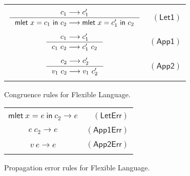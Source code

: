 \documentclass[preprint,authoryear,sort&compress,9pt,nocopyrightspace]{article}
\newcommand\rulename[1]{\mathsf{(#1)}}
\newcommand{\tto}{\longrightarrow}
\newcommand{\oletP}[3]{\mathsf{mlet} \ x = #2 \ \mathsf{in}  \ #3}
\newcommand{\semanticA}{Flexible Language}
\begin{document}
\begin{figure}[h]
\begin{small}
\begin{center}
\begin{tabular}{|c r|}
\hline
&\\
$ \inference {c_1 \tto c_1'}{\oletP{T_1}{c_1}{c_2} \tto \oletP{T_1}{c_1'}{c_2} }$&$\rulename{Let1} $\\
&\\
$\inference {c_1 \tto c_1'}{c_1 \ c_2 \tto c_1' \ c_2} $&$\rulename{App1}  $\\
&\\
$ \inference {c_2 \tto c_2'}{v_1 \ c_2 \tto v_1 \ c_2'}$&$\rulename{App2}  $\\
&\\
\hline
\end{tabular}
\caption{Congruence rules for \semanticA.}
\label{tabla:congruenceRules}
\end{center}
\end{small}
\end{figure}

\begin{figure}[h]
\begin{small}
\begin{center}
\begin{tabular}{|c r|}
\hline
&\\
$ {\oletP{T_1}{e}{c_2} \tto e  }$&$\rulename{LetErr} $\\
&\\
${e \ c_2 \tto e} $&$\rulename{App1Err}  $\\
&\\
$ {v \ e \tto e}$&$\rulename{App2Err}$\\
&\\
\hline
\end{tabular}
\caption{Propagation error rules for \semanticA.}
\label{tabla:errorRules}
\end{center}
\end{small}
\end{figure}
\end{document}
